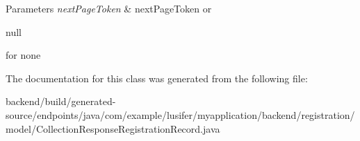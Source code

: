 \begin{DoxyParams}{Parameters}
{\em next\+Page\+Token} & next\+Page\+Token or
\begin{DoxyCode}
null 
\end{DoxyCode}
 for none \\
\hline
\end{DoxyParams}


The documentation for this class was generated from the following file\+:\begin{DoxyCompactItemize}
\item 
backend/build/generated-\/source/endpoints/java/com/example/lusifer/myapplication/backend/registration/model/Collection\+Response\+Registration\+Record.\+java\end{DoxyCompactItemize}
